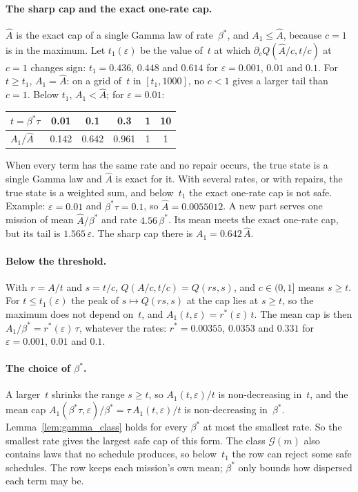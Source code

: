 \documentclass[11pt,a4paper]{article}
\theoremstyle{plain}
\theoremstyle{definition}
\theoremstyle{remark}
\begin{document}
\paragraph{The sharp cap and the exact one-rate cap.}
$\hat A$ is the exact cap of a single Gamma law of rate~$\beta^*$, and $A_1 \le \hat A$, because $c = 1$ is in the maximum.
Let $t_1(\varepsilon)$ be the value of~$t$ at which $\partial_c Q(\hat A/c, t/c)$ at $c = 1$ changes sign: $t_1 = 0.436$, $0.448$ and $0.614$ for $\varepsilon = 0.001$, $0.01$ and $0.1$.
For $t \ge t_1$, $A_1 = \hat A$: on a grid of~$t$ in $[t_1, 1000]$, no $c < 1$ gives a larger tail than $c = 1$.
Below $t_1$, $A_1 < \hat A$; for $\varepsilon = 0.01$:
\begin{center}
\small
\begin{tabular}{@{}lccccc@{}}
\toprule
$t = \beta^*\tau$ & 0.01 & 0.1 & 0.3 & 1 & 10 \\
\midrule
$A_1/\hat A$ & 0.142 & 0.642 & 0.961 & 1 & 1 \\
\bottomrule
\end{tabular}
\end{center}
When every term has the same rate and no repair occurs, the true state is a single Gamma law and $\hat A$ is exact for it.
With several rates, or with repairs, the true state is a weighted sum, and below~$t_1$ the exact one-rate cap is not safe.
Example: $\varepsilon = 0.01$ and $\beta^*\tau = 0.1$, so $\hat A = 0.0055012$.
A new part serves one mission of mean $\hat A/\beta^*$ and rate $4.56\,\beta^*$.
Its mean meets the exact one-rate cap, but its tail is $1.565\,\varepsilon$.
The sharp cap there is $A_1 = 0.642\,\hat A$.

\paragraph{Below the threshold.}
With $r = A/t$ and $s = t/c$, $Q(A/c, t/c) = Q(rs, s)$, and $c \in (0, 1]$ means $s \ge t$.
For $t \le t_1(\varepsilon)$ the peak of $s \mapsto Q(rs, s)$ at the cap lies at $s \ge t$, so the maximum does not depend on~$t$, and $A_1(t, \varepsilon) = r^*(\varepsilon)\, t$.
The mean cap is then $A_1/\beta^* = r^*(\varepsilon)\,\tau$, whatever the rates: $r^* = 0.00355$, $0.0353$ and $0.331$ for $\varepsilon = 0.001$, $0.01$ and $0.1$.

\paragraph{The choice of $\beta^*$.}
A larger~$t$ shrinks the range $s \ge t$, so $A_1(t, \varepsilon)/t$ is non-decreasing in~$t$, and the mean cap $A_1(\beta^*\tau, \varepsilon)/\beta^* = \tau\, A_1(t, \varepsilon)/t$ is non-decreasing in~$\beta^*$.
Lemma~\ref{lem:gamma_class} holds for every $\beta^*$ at most the smallest rate.
So the smallest rate gives the largest safe cap of this form.
The class $\mathcal{G}(m)$ also contains laws that no schedule produces, so below~$t_1$ the row can reject some safe schedules.
The row keeps each mission's own mean; $\beta^*$ only bounds how dispersed each term may be.
\end{document}
